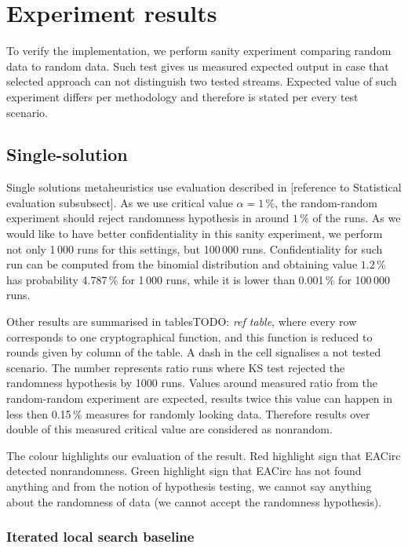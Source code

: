 \documentclass[
  print, %
  Table,   %
  nolof,     %
  nolot,     %
  11pt, %
  oneside  %
]{fithesis3}
\newcommand{\todo}[1]{TODO: \textit{#1}}
\begin{document}
\chapter{Experiment results}

To verify the implementation, we perform sanity experiment comparing random data to random data. Such test gives us measured expected output in case that selected approach can not distinguish two tested streams. Expected value of such experiment differs per methodology and therefore is stated per every test scenario.

\section{Single-solution}


Single solutions metaheuristics use evaluation described in [reference to Statistical evaluation subsubsect]. As we use critical value $\alpha=1\,\%$, the random-random experiment should reject randomness hypothesis in around $1\,\%$ of the runs. As we would like to have better confidentiality in this sanity experiment, we perform not only 1\,000 runs for this settings, but 100\,000 runs. Confidentiality for such run can be computed from the binomial distribution and obtaining value $1.2\,\%$ has probability 4.787\,\% for 1\,000 runs, while it is lower than 0.001\,\% for 100\,000 runs.

Other results are summarised in tables\todo{ref table}, where every row corresponds to one cryptographical function, and this function is reduced to rounds given by column of the table. A dash in the cell signalises a not tested scenario. The number represents ratio runs where KS test rejected the randomness hypothesis by 1000 runs. Values around measured ratio from the random-random experiment are expected, results twice this value can happen in less then 0.15\,\% measures for randomly looking data. Therefore results over double of this measured critical value are considered as nonrandom.

The colour highlights our evaluation of the result. Red highlight sign that EACirc detected nonrandomness. Green highlight sign that EACirc has not found anything and from the notion of hypothesis testing, we cannot say anything about the randomness of data (we cannot accept the randomness hypothesis).

\subsection{Iterated local search baseline}
\end{document}
